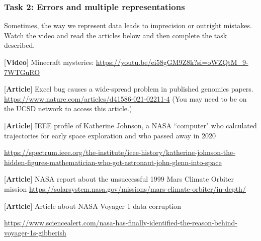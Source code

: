 \subsubsection*{Task 2: Errors and multiple representations}

Sometimes, the way we represent data leads to imprecision or outright mistakes. 
Watch the video and read the articles below and then complete the task described.


[{\bf Video}] Minecraft mysteries: {\small \url{https://youtu.be/ei58gGM9Z8k?si=oWZQtM_9-7WTGuRO}}

[{\bf Article}]  Excel bug causes a wide-spread problem in published genomics papers.
{\small \url{https://www.nature.com/articles/d41586-021-02211-4}  (You may need to be on the UCSD network to access this article.)}

[{\bf Article}] IEEE profile of Katherine Johnson, a NASA ``computer" who calculated trajectories for 
early space exploration and who passed away in 2020

{\small \url{https://spectrum.ieee.org/the-institute/ieee-history/katherine-johnson-the-hidden-figures-mathematician-who-got-astronaut-john-glenn-into-space}}

[{\bf Article}] NASA report about the unsuccessful 1999 Mars Climate Orbiter mission
{\small \url{https://solarsystem.nasa.gov/missions/mars-climate-orbiter/in-depth/}}

[{\bf Article}] Article about NASA Voyager 1 data corruption

{\small \url{https://www.sciencealert.com/nasa-has-finally-identified-the-reason-behind-voyager-1s-gibberish}}


